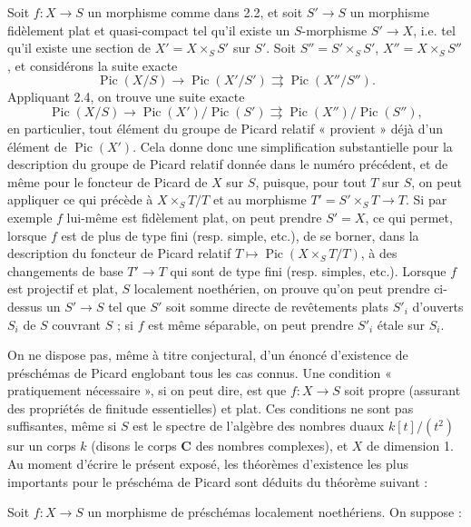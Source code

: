  Soit $f:X\longrightarrow S$ un morphisme comme dans
2.2, et soit $S'\longrightarrow S$ un morphisme fidèlement plat et
quasi-compact tel qu'il existe un $S$-morphisme $S'\longrightarrow X$, i.e. tel
qu'il existe une section de $X'=X\times_SS'$ sur $S'$. Soit
$S''=S'\times_SS'$, $X''=X\times_SS''$, et considérons la suite exacte
\[
\operatorname{Pic}(X/S)\longrightarrow\operatorname{Pic}(X'/S')
\rightrightarrows\operatorname{Pic}(X''/S'').
\]
Appliquant 2.4, on trouve une suite exacte
\[
\operatorname{Pic}(X/S)\longrightarrow
\operatorname{Pic}(X')/\operatorname{Pic}(S')
\rightrightarrows
\operatorname{Pic}(X'')/\operatorname{Pic}(S''),
\]
en particulier, tout élément du groupe de Picard relatif « provient » déjà
d'un élément de $\operatorname{Pic}(X')$. Cela donne donc une simplification
substantielle pour la description du groupe de Picard relatif donnée dans le
numéro précédent, et de même pour le foncteur de Picard de $X$ sur $S$, puisque,
pour tout $T$ sur $S$, on peut appliquer ce qui précède à
$X\times_ST/T$ et au morphisme $T'=S'\times_ST\longrightarrow T$. Si par
exemple $f$ lui-même est fidèlement plat, on peut prendre $S'=X$, ce qui permet,
lorsque $f$ est de plus de type fini (resp. simple, etc.), de se borner, dans la
description du foncteur de Picard relatif
$T\longmapsto\operatorname{Pic}(X\times_ST/T)$, à des changements de base
$T'\longrightarrow T$ qui sont de type fini (resp. simples, etc.). Lorsque $f$
est projectif et plat, $S$ localement noethérien, on prouve qu'on peut prendre
ci-dessus un $S'\longrightarrow S$ tel que $S'$ soit somme directe de
revêtements plats $S'_i$ d'ouverts $S_i$ de $S$ couvrant $S$ ; si $f$ est même
séparable, on peut prendre $S'_i$ étale sur $S_i$.


On ne dispose pas, même à titre conjectural, d'un énoncé d'existence de
préschémas de Picard englobant tous les cas connus. Une condition « pratiquement
nécessaire », si on peut dire, est que $f:X\longrightarrow S$ soit propre
(assurant des propriétés de finitude essentielles) et plat. Ces conditions ne
sont pas suffisantes, même si $S$ est le spectre de l'algèbre des nombres duaux
$k[t]/(t^2)$ sur un corps $k$ (disons le corps $\mathbf C$ des nombres
complexes), et $X$ de dimension 1. Au moment d'écrire le présent exposé, les
théorèmes d'existence les plus importants pour le préschéma de Picard sont
déduits du théorème suivant :

 Soit $f:X\longrightarrow S$ un morphisme de préschémas
localement noethériens. On suppose :

